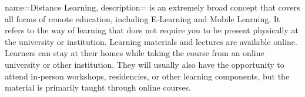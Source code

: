 




{
    name=Distance Learning,
    description={ is an extremely broad concept that covers all forms of remote education, including E-Learning and Mobile Learning. It refers to the way of learning that does not require you to be present physically at the university or institution. Learning materials and lectures are available online. Learners can stay at their homes while taking the course from an online university or other institution. They will usually also have the opportunity to attend in-person workshops, residencies, or other learning components, but the material is primarily taught through online courses.}
}





\printglossary